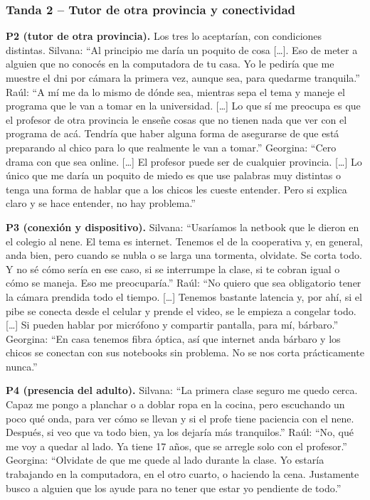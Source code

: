 \subsubsection*{Tanda 2 -- Tutor de otra provincia y conectividad}

\textbf{P2 (tutor de otra provincia).} Los tres lo aceptarían, con
condiciones distintas. Silvana: ``Al principio me daría un poquito de
cosa [\ldots]. Eso de meter a alguien que no conocés en la computadora de
tu casa. Yo le pediría que me muestre el \gls{dni} por cámara la primera
vez, aunque sea, para quedarme tranquila.'' Raúl: ``A mí me da lo mismo
de dónde sea, mientras sepa el tema y maneje el programa que le van a
tomar en la universidad. [\ldots] Lo que sí me preocupa es que el
profesor de otra provincia le enseñe cosas que no tienen nada que ver con
el programa de acá. Tendría que haber alguna forma de asegurarse de que
está preparando al chico para lo que realmente le van a tomar.''
Georgina: ``Cero drama con que sea online. [\ldots] El profesor puede ser
de cualquier provincia. [\ldots] Lo único que me daría un poquito de miedo
es que use palabras muy distintas o tenga una forma de hablar que a los
chicos les cueste entender. Pero si explica claro y se hace entender, no
hay problema.''

\textbf{P3 (conexión y dispositivo).} Silvana: ``Usaríamos la netbook que
le dieron en el colegio al nene. El tema es internet. Tenemos el de la
cooperativa y, en general, anda bien, pero cuando se nubla o se larga una
tormenta, olvidate. Se corta todo. Y no sé cómo sería en ese caso, si se
interrumpe la clase, si te cobran igual o cómo se maneja. Eso me
preocuparía.'' Raúl: ``No quiero que sea obligatorio tener la cámara
prendida todo el tiempo. [\ldots] Tenemos bastante latencia y, por ahí, si
el pibe se conecta desde el celular y prende el video, se le empieza a
congelar todo. [\ldots] Si pueden hablar por micrófono y compartir
pantalla, para mí, bárbaro.'' Georgina: ``En casa tenemos fibra óptica,
así que internet anda bárbaro y los chicos se conectan con sus notebooks
sin problema. No se nos corta prácticamente nunca.''

\textbf{P4 (presencia del adulto).} Silvana: ``La primera clase seguro me
quedo cerca. Capaz me pongo a planchar o a doblar ropa en la cocina, pero
escuchando un poco qué onda, para ver cómo se llevan y si el profe tiene
paciencia con el nene. Después, si veo que va todo bien, ya los dejaría
más tranquilos.'' Raúl: ``No, qué me voy a quedar al lado. Ya tiene 17
años, que se arregle solo con el profesor.'' Georgina: ``Olvidate de que
me quede al lado durante la clase. Yo estaría trabajando en la
computadora, en el otro cuarto, o haciendo la cena. Justamente busco a
alguien que los ayude para no tener que estar yo pendiente de todo.''


